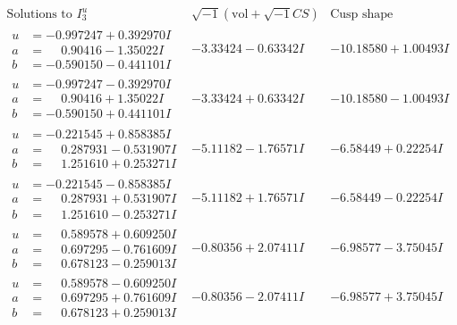 \documentclass[1p]{elsarticle_modified}
\theoremstyle{definition}
\newcommand{\I}{\sqrt{-1}}
\begin{document}
$$\begin{array}{c|c|c}  
\text{Solutions to }I^u_{3}& \I (\text{vol} + \sqrt{-1}CS) & \text{Cusp shape}\\
 \hline 
\begin{aligned}
u &= -0.997247 + 0.392970 I \\
a &= \phantom{-}0.90416 - 1.35022 I \\
b &= -0.590150 - 0.441101 I\end{aligned}
 & -3.33424 - 0.63342 I & -10.18580 + 1.00493 I \\ \hline\begin{aligned}
u &= -0.997247 - 0.392970 I \\
a &= \phantom{-}0.90416 + 1.35022 I \\
b &= -0.590150 + 0.441101 I\end{aligned}
 & -3.33424 + 0.63342 I & -10.18580 - 1.00493 I \\ \hline\begin{aligned}
u &= -0.221545 + 0.858385 I \\
a &= \phantom{-}0.287931 - 0.531907 I \\
b &= \phantom{-}1.251610 + 0.253271 I\end{aligned}
 & -5.11182 - 1.76571 I & -6.58449 + 0.22254 I \\ \hline\begin{aligned}
u &= -0.221545 - 0.858385 I \\
a &= \phantom{-}0.287931 + 0.531907 I \\
b &= \phantom{-}1.251610 - 0.253271 I\end{aligned}
 & -5.11182 + 1.76571 I & -6.58449 - 0.22254 I \\ \hline\begin{aligned}
u &= \phantom{-}0.589578 + 0.609250 I \\
a &= \phantom{-}0.697295 - 0.761609 I \\
b &= \phantom{-}0.678123 - 0.259013 I\end{aligned}
 & -0.80356 + 2.07411 I & -6.98577 - 3.75045 I \\ \hline\begin{aligned}
u &= \phantom{-}0.589578 - 0.609250 I \\
a &= \phantom{-}0.697295 + 0.761609 I \\
b &= \phantom{-}0.678123 + 0.259013 I\end{aligned}
 & -0.80356 - 2.07411 I & -6.98577 + 3.75045 I \\ \hline\begin{aligned}

\end{aligned}
\end{array}$$
\end{document}
